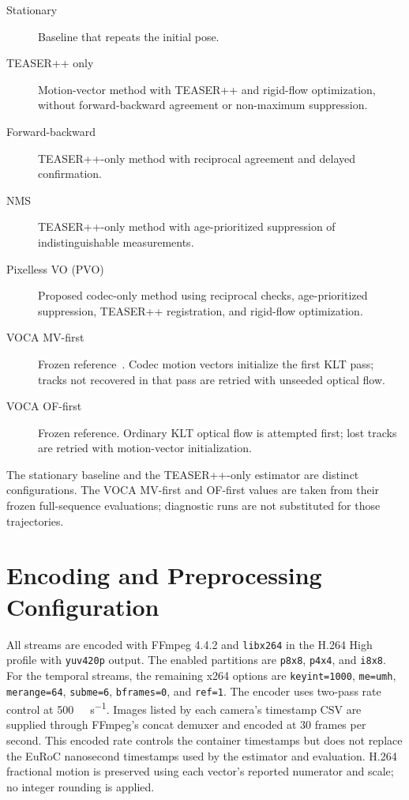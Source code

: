 \begin{description}
  \item[Stationary] Baseline that repeats the initial pose.
  \item[TEASER++ only] Motion-vector method with TEASER++ and rigid-flow optimization, without forward-backward agreement or non-maximum suppression.
  \item[Forward-backward] TEASER++-only method with reciprocal agreement and delayed confirmation.
  \item[NMS] TEASER++-only method with age-prioritized suppression of indistinguishable measurements.
  \item[Pixelless VO (PVO)] Proposed codec-only method using reciprocal checks,
    age-prioritized suppression, TEASER++ registration, and rigid-flow
    optimization.
  \item[VOCA MV-first] Frozen reference~\cite{hilscher2026voca}. Codec motion vectors initialize the first
    KLT pass; tracks not recovered in that pass are retried with unseeded optical
    flow.
  \item[VOCA OF-first] Frozen reference. Ordinary KLT optical flow is attempted
    first; lost tracks are retried with motion-vector initialization.
\end{description}

The stationary baseline and the TEASER++-only estimator are distinct
configurations. The VOCA MV-first and OF-first values are taken from their
frozen full-sequence evaluations; diagnostic runs are not substituted for those
trajectories.

\section{Encoding and Preprocessing Configuration}

All streams are encoded with FFmpeg 4.4.2 and \texttt{libx264} in the H.264
High profile with \texttt{yuv420p} output. The enabled partitions are
\texttt{p8x8}, \texttt{p4x4}, and \texttt{i8x8}. For the temporal streams,
the remaining x264 options
are \texttt{keyint=1000}, \texttt{me=umh}, \texttt{merange=64},
\texttt{subme=6}, \texttt{bframes=0}, and \texttt{ref=1}. The encoder uses
two-pass rate control at
\SI{500}{\kilo\bit\per\second}. Images listed by each camera's timestamp CSV
are supplied through FFmpeg's concat demuxer and encoded at 30 frames per
second. This encoded rate controls the container timestamps but does not replace
the EuRoC nanosecond timestamps used by the estimator and evaluation. H.264
fractional motion is preserved using each vector's reported numerator and scale;
no integer rounding is applied.

